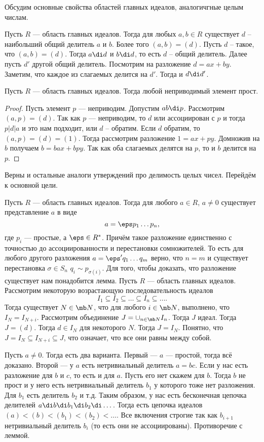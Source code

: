 Обсудим основные свойства областей главных идеалов, аналогичгные целым числам.

  Пусть $R$ --- область главных идеалов. Тогда для любых $a,b \in R$ существует $d$ -- наибольший общий делитель $a$ и $b$. Более того $(a,b)=(d)$.
\elm
\proof Пусть $d$ -- такое, что $(a,b)=(d)$. Тогда $a\di d$ и $b\di d$, то есть $d$ -- общий делитель. Далее пусть $d'$ другой общий делитель. Посмотрим на разложение $d=ax+by$. Заметим, что каждое из слагаемых делится на $d'$. Тогда и $d\di d'$. 
\endproof

\lm[Простой=неприводимый в ОГИ] Пусть $R$ --- область главных идеалов. Тогда любой неприводимый элемент прост. 
\begin{proof} Пусть элемент $p$ --- неприводим. Допустим $ab\di p$. Рассмотрим $(a,p)=(d)$. Так как $p$ --- неприводим, то $d$ или ассоциирован с $p$ и тогда $p|d|a$ и это нам подходит, или $d $ -- обратим. Если $d$ обратим, то $(a,p)=(d)=(1)$. Тогда рассмотрим разложение $1 = ax  + py$. Домножив на $b$ получаем $b = bax+bpy$. Так как оба слагаемых делятся на $p$, то и $b$ делится на $p$.
\end{proof}
\elm


Верны и остальные аналоги утверждений про делимость целых чисел. Перейдём к основной цели.



 Пусть $R$ --- область главных идеалов. Тогда для любого $a\in R$, $a\neq 0$ существует представление $a$ в виде 
$$ a=\eps p_1\dots p_n,$$
где $p_i$ --- простые, а $\eps \in R^*$. Причём такое разложение единственно с точностью до ассоциированности и перестановки сомножителей. То есть для любого другого разложения $a=\eps' q_1\dots q_m$ верно, что $n=m$ и существует перестановка $\sigma \in S_n$ $q_i\sim p_{\sigma(i)}$.
\ethrm Для того, чтобы доказать, что разложение существует нам понадобится лемма.
\lm Пусть $R$ --- область главных идеалов. Рассмотрим некоторую возрастающую последовательность идеалов
$$I_1\subseteq I_2\subseteq \dots \subseteq I_n\subseteq \dots.$$ Тогда существует $N\in \mb N$, что для любого $i\in \mb N$, выполнено, что $I_{N}=I_{N+i}$.
\elm {} Рассмотрим объединение $J=\cup_{n\in \mb N} I_n$. Тогда $J$ идеал. Тогда $J=(d)$. Тогда $d\in I_N$ для некоторого $N$. Тогда $J=I_N$. Понятно, что $J=I_N\subseteq I_{N+i}\subseteq J$, что означает, что все они равны между собой.
\endproof

\proof[Существование] Пусть $a\neq 0$. Тогда есть два варианта. Первый --- $a$ --- простой, тогда всё доказано. Второй --- у $a$ есть нетривиальный делитель $a=bc$. Если у нас есть разложение для $b$ и $c$, то есть и для $a$. Пусть его нет скажем для $b$. Тогда $b$ не прост и у него есть нетривиальный делитель $b_1$ у которого тоже нет разложения. Для $b_1$ есть делитель $b_2$ и т.д. Таким образом, у нас есть бесконечная цепочка делителей $a \di b \di b_1 \di b_2 \di \dots$. Тогда есть цепочка идеалов $(a)<(b)<(b_1)<(b_2)<\dots$. Все включения строгие так как $b_{i+1}$ нетривиальный делитель $b_i$ (то есть они не ассоциированы). Противоречие с леммой.

